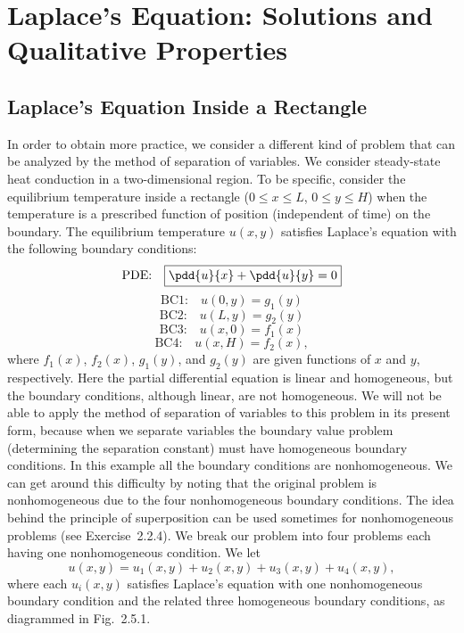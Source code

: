 \section{Laplace's Equation: Solutions and Qualitative Properties}
\label{sec:2.5}

\subsection{Laplace's Equation Inside a Rectangle}
\label{sec:2.5.1}

In order to obtain more practice, we consider a different kind of problem that can be analyzed by the method of separation of variables. We consider steady-state heat conduction in a two-dimensional region. To be specific, consider the equilibrium temperature inside a rectangle ($0 \le x \le L$, $0 \le y \le H$) when the temperature is a prescribed function of position (independent of time) on the boundary. The equilibrium temperature $u(x,y)$ satisfies Laplace's equation with the following boundary conditions:
\begin{equation}
\label{eq:2.5.1}
\text{PDE:}\quad \boxed{\pdd{u}{x} + \pdd{u}{y} = 0}
\end{equation}
\begin{equation}
\label{eq:2.5.2}
\text{BC1:}\quad \boxed{u(0,y) = g_1(y)}
\end{equation}
\begin{equation}
\label{eq:2.5.3}
\text{BC2:}\quad \boxed{u(L,y) = g_2(y)}
\end{equation}
\begin{equation}
\label{eq:2.5.4}
\text{BC3:}\quad \boxed{u(x,0) = f_1(x)}
\end{equation}
\begin{equation}
\label{eq:2.5.5}
\text{BC4:}\quad \boxed{u(x,H) = f_2(x),}
\end{equation}
where $f_1(x)$, $f_2(x)$, $g_1(y)$, and $g_2(y)$ are given functions of $x$ and $y$, respectively. Here the partial differential equation is linear and homogeneous, but the boundary conditions, although linear, are not homogeneous. We will not be able to apply the method of separation of variables to this problem in its present form, because when we separate variables the boundary value problem (determining the separation constant) must have homogeneous boundary conditions. In this example all the boundary conditions are nonhomogeneous. We can get around this difficulty by noting that the original problem is nonhomogeneous due to the four nonhomogeneous boundary conditions. The idea behind the principle of superposition can be used sometimes for nonhomogeneous problems (see Exercise~2.2.4). We break our problem into four problems each having one nonhomogeneous condition. We let
\begin{equation}
\label{eq:2.5.6}
u(x,y) = u_1(x,y) + u_2(x,y) + u_3(x,y) + u_4(x,y),
\end{equation}
where each $u_i(x,y)$ satisfies Laplace's equation with one nonhomogeneous boundary condition and the related three homogeneous boundary conditions, as diagrammed in Fig.~2.5.1.

